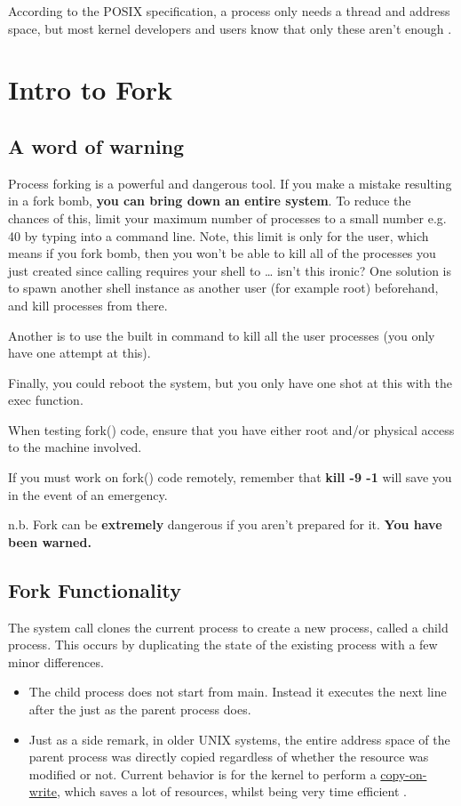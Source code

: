 According to the POSIX specification, a process only needs a thread and address space, but most kernel developers and users know that only these aren't enough \cite{process_def}.

\section{Intro to Fork}

\subsection{A word of warning}

Process forking is a powerful and dangerous tool.
If you make a mistake resulting in a fork bomb, \textbf{you can bring down an entire system}.
To reduce the chances of this, limit your maximum number of processes to a small number e.g. 40 by typing  into a command line.
Note, this limit is only for the user, which means if you fork bomb, then you won't be able to kill all of the processes you just created since calling  requires your shell to  \ldots{} isn't this ironic? One solution is to spawn another shell instance as another user (for example root) beforehand, and kill processes from there.

Another is to use the built in  command to kill all the user processes (you only have one attempt at this).

Finally, you could reboot the system, but you only have one shot at this with the exec function.

When testing fork() code, ensure that you have either root and/or physical access to the machine involved.

If you must work on fork() code remotely, remember that \textbf{kill -9 -1} will save you in the event of an emergency.

n.b. Fork can be \textbf{extremely} dangerous if you aren't prepared for it. \textbf{You have been warned.}

\subsection{Fork Functionality}

The  system call clones the current process to create a new process, called a child process.
This occurs by duplicating the state of the existing process with a few minor differences.
\begin{itemize}
    \item The child process does not start from main. Instead it executes the next line after the  just as the parent process does.
    \item Just as a side remark, in older UNIX systems, the entire address space of the parent process was directly copied regardless of whether the resource was modified or not. Current behavior is for the kernel to perform a \href{https://en.wikipedia.org/wiki/Copy-on-write}{copy-on-write}, which saves a lot of resources, whilst being very time efficient \cite[Copy-on-write section]{Bovet:2005:ULK:1077084}.
\end{itemize}

